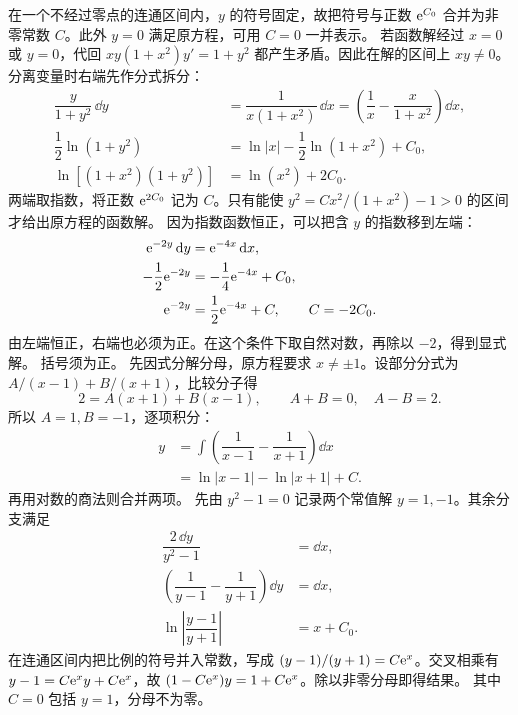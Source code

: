 在一个不经过零点的连通区间内，$y$ 的符号固定，故把符号与正数 $\mathrm e^{C_0}$ 合并为非零常数 $C$。此外 $y=0$ 满足原方程，可用 $C=0$ 一并表示。
若函数解经过 $x=0$ 或 $y=0$，代回 $xy(1+x^2)y'=1+y^2$ 都产生矛盾。因此在解的区间上 $xy\ne0$。分离变量时右端先作分式拆分：
\[
\begin{aligned}
\dfrac{y}{1+y^2}\,\dd y
 &=\dfrac1{x(1+x^2)}\,\dd x
 =\left(\dfrac1x-\dfrac{x}{1+x^2}\right)\dd x,\\
\dfrac12\ln(1+y^2)
 &=\ln|x|-\dfrac12\ln(1+x^2)+C_0,\\
\ln[(1+x^2)(1+y^2)]&=\ln(x^2)+2C_0.
\end{aligned}
\]
两端取指数，将正数 $\mathrm e^{2C_0}$ 记为 $C$。只有能使 $y^2=Cx^2/(1+x^2)-1>0$ 的区间才给出原方程的函数解。
因为指数函数恒正，可以把含 $y$ 的指数移到左端：
\[
\begin{aligned}
\mathrm e^{-2y}\,\mathrm d y&=\mathrm e^{-4x}\,\mathrm d x,\\
-\dfrac12\mathrm e^{-2y}&=-\dfrac14\mathrm e^{-4x}+C_0,\\
\mathrm e^{-2y}&=\dfrac12\mathrm e^{-4x}+C,\qquad C=-2C_0.
\end{aligned}
\]
由左端恒正，右端也必须为正。在这个条件下取自然对数，再除以 $-2$，得到显式解。
括号须为正。
先因式分解分母，原方程要求 $x\ne\pm1$。设部分分式为 $A/(x-1)+B/(x+1)$，比较分子得
\[
2=A(x+1)+B(x-1),\qquad A+B=0,\quad A-B=2.
\]
所以 $A=1,B=-1$，逐项积分：
\[
\begin{aligned}
y&=\int\left(\dfrac1{x-1}-\dfrac1{x+1}\right)\dd x\\
 &=\ln|x-1|-\ln|x+1|+C.
\end{aligned}
\]
再用对数的商法则合并两项。
先由 $y^2-1=0$ 记录两个常值解 $y=1,-1$。其余分支满足
\[
\begin{aligned}
\dfrac{2\,\dd y}{y^2-1}&=\dd x,\\
\left(\dfrac1{y-1}-\dfrac1{y+1}\right)\dd y&=\dd x,\\
\ln\left|\dfrac{y-1}{y+1}\right|&=x+C_0.
\end{aligned}
\]
在连通区间内把比例的符号并入常数，写成 $(y-1)/(y+1)=C\mathrm e^x$。交叉相乘有 $y-1=C\mathrm e^xy+C\mathrm e^x$，故 $(1-C\mathrm e^x)y=1+C\mathrm e^x$。除以非零分母即得结果。
其中 $C=0$ 包括 $y=1$，分母不为零。
